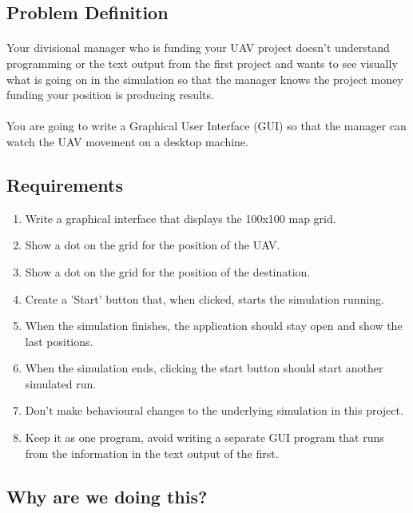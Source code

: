 \documentclass[11pt]{book}
\begin{document}
\subsection{Problem Definition}

\paragraph{} Your divisional manager who is funding your UAV project doesn't understand programming or the text output from the first project and wants to see visually what is going on in the simulation so that the manager knows the project money funding your position is producing results.

\paragraph{} You are going to write a Graphical User Interface (GUI) so that the manager can watch the UAV movement on a desktop machine.

\subsection{Requirements}

\begin{enumerate}
\item Write a graphical interface that displays the 100x100 map grid.
\item Show a dot on the grid for the position of the UAV.
\item Show a dot on the grid for the position of the destination.
\item Create a 'Start' button that, when clicked, starts the simulation running.
\item When the simulation finishes, the application should stay open and show the last positions.
\item When the simulation ends, clicking the start button should start another simulated run.
\item Don't make behavioural changes to the underlying simulation in this project.
\item Keep it as one program, avoid writing a separate GUI program that runs from the information in the text output of the first.
\end{enumerate}

\subsection{Why are we doing this?}
\end{document}
